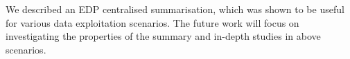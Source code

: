We described an EDP centralised summarisation, which was shown to be useful for various data exploitation scenarios. The future work will focus on investigating the properties of the summary and in-depth studies in above scenarios.
